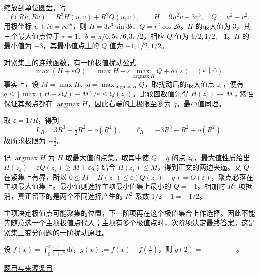 \documentclass[UTF8,12pt,a4paper,fontset=fandol]{ctexart}
\begin{document}
\begin{solve}\label{ans:fin17-high:2}

缩放到单位圆盘，写
\[
f(Ru,Rv)=R^3H(u,v)+R^2Q(u,v),\qquad
H=9u^2v-3v^3,\quad Q=u^2-v^2.
\]
用极坐标 $u+iv=re^{i\theta}$，则 $H=3r^3\sin3\theta$、$Q=r^2\cos2\theta$。$H$ 的最大值为 $3$，其三个最大值点位于 $r=1$、$\theta=\pi/6,5\pi/6,3\pi/2$，相应 $Q$ 值为 $1/2,1/2,-1$。$H$ 的最小值为 $-3$，其最小值点上的 $Q$ 值为 $-1,1/2,1/2$。

对紧集上的连续函数，有一阶极值扰动公式
\[
\max(H+\varepsilon Q)=\max H+\varepsilon\max_{\operatorname{argmax}H}Q+o(\varepsilon)
\quad(\varepsilon\downarrow0).
\]
事实上，设 $M=\max H$、$q=\max_{\operatorname{argmax}H}Q$，取扰动后的最大值点 $z_\varepsilon$，便有 $q\le[\max(H+\varepsilon Q)-M]/\varepsilon\le Q(z_\varepsilon)$。比较函数值先得 $H(z_\varepsilon)\to M$；紧性保证其聚点都在 $\operatorname{argmax}H$，因此右端的上极限至多为 $q$。最小值同理。

取 $\varepsilon=1/R$，得到
\[
L_R=3R^3+\tfrac12R^2+o(R^2),\qquad
\ell_R=-3R^3-R^2+o(R^2).
\]
故所求极限为 $\boxed{-\tfrac12}$。

记 $\operatorname{argmax}H$ 为 $H$ 取最大值的点集。取其中使 $Q=q$ 的点 $z_0$，最大值性质给出 $H(z_\varepsilon)+\varepsilon Q(z_\varepsilon)\ge M+\varepsilon q$；结合 $H(z_\varepsilon)\le M$，得到正文的两边夹逼。又 $Q$ 在紧集上有界，所以 $0\le M-H(z_\varepsilon)\le\varepsilon(Q(z_\varepsilon)-q)=O(\varepsilon)$，聚点必落在主项最大值集上。最小值则选择主项最小值集上最小的 $Q=-1$。相加时 $R^3$ 项抵消，真正留下的是两个不同选择产生的 $R^2$ 系数 $1/2-1=-1/2$。

\end{solve}

\begin{remark}[方法与条件]主项决定极值点可能聚集的位置，下一阶项再在这个极值集合上作选择。因此不能先随意选一个主项极值点代入；主项有多个极值点时，次阶项决定最终答案。这是紧集上变分问题的一阶扰动原理。\end{remark}

\begin{example}[来源序号3]\label{ex:fin17-high:3}\label{pr:fin17-high:3}

设 $f(x)=\int_0^x\frac{1}{1+t^3}\,\mathrm{d}t$，$g(x):=f(x)-f\left(\frac{1}{x}\right)$，则 $g(2)=\underline{\hspace{2cm}}$。

\par\href{https://github.com/lzxcr/cmc-mathematics/blob/64916fa1fdbc3e444a652eca204d5669058ee321/src/problems/finals/17/03.md}{题目与来源条目}

\end{example}
\end{document}
